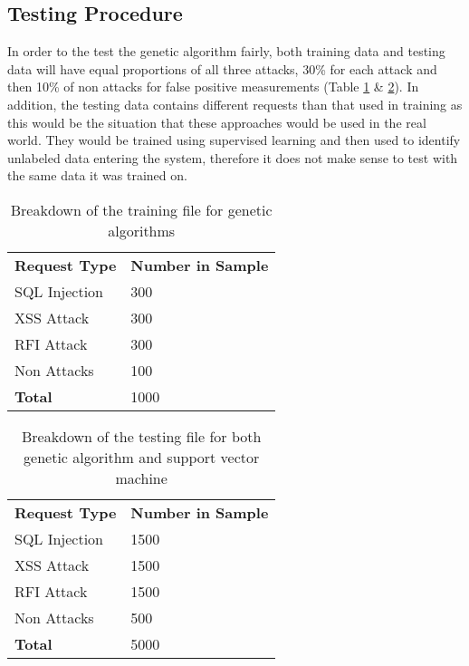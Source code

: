 \subsection{Testing Procedure}

In order to the test the genetic algorithm fairly, both training data and testing data will have equal proportions of all three attacks, 30\% for each attack and then 10\% of non attacks for false positive measurements (Table \ref{tab:trainingfile} \& \ref{tab:testfile}).  In addition, the testing data contains different requests than that used in training as this would be the situation that these approaches would be used in the real world.  They would be trained using supervised learning and then used to identify unlabeled data entering the system, therefore it does not make sense to test with the same data it was trained on.

\begin{table}
	\centering
	\begin{tabular}{|p{1.5in}|p{2.0in}|}
	\hline
		\textbf{Request Type} & \textbf{Number in Sample}\\
	\hhline{|=|=|}
		SQL Injection & 300 \\
	\hline
		XSS Attack & 300 \\
	\hline
		RFI Attack & 300 \\
	\hline
		Non Attacks & 100 \\
	\hhline{|=|=|}
		\textbf{Total} & 1000 \\
	\hline
	\end{tabular}
	\caption{Breakdown of the training file for genetic algorithms}
	\label{tab:trainingfile}
\end{table}	
	
\begin{table}
	\centering
	\begin{tabular}{|p{1.5in}|p{2.0in}|}
	\hline
		\textbf{Request Type} & \textbf{Number in Sample}\\
	\hhline{|=|=|}
		SQL Injection & 1500 \\
	\hline
		XSS Attack & 1500 \\
	\hline
		RFI Attack & 1500 \\
	\hline
		Non Attacks & 500 \\
	\hhline{|=|=|}
		\textbf{Total} & 5000 \\
	\hline
	\end{tabular}
	\caption{Breakdown of the testing file for both genetic algorithm and support vector machine}
	\label{tab:testfile}
\end{table}	

